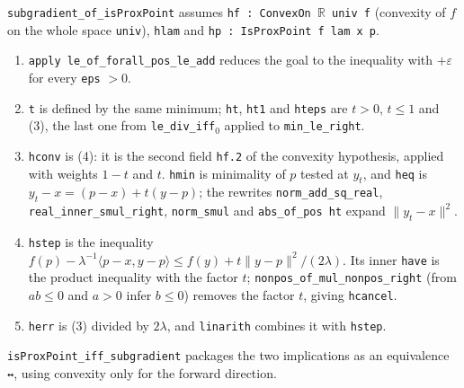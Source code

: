 \documentclass[11pt,a4paper]{article}
\begin{document}
\begin{leanbox}
\texttt{subgradient\_\allowbreak{}of\_\allowbreak{}is\allowbreak{}Prox\allowbreak{}Point} assumes \texttt{hf : Convex\allowbreak{}On \ensuremath{\mathbb R} univ f} (convexity of \(f\) on the whole space \texttt{univ}), \texttt{hlam} and \texttt{hp : Is\allowbreak{}Prox\allowbreak{}Point f lam x p}.



\begin{enumerate}


\item \texttt{apply le\_\allowbreak{}of\_\allowbreak{}forall\_\allowbreak{}pos\_\allowbreak{}le\_\allowbreak{}add} reduces the goal to the inequality with \(+\varepsilon\) for every \texttt{eps} \(>0\).

\item \texttt{t} is defined by the same minimum; \texttt{ht}, \texttt{ht1} and \texttt{hteps} are \(t>0\), \(t\le1\) and (3), the last one from \texttt{le\_\allowbreak{}div\_\allowbreak{}iff\ensuremath{{}_{0}}} applied to \texttt{min\_\allowbreak{}le\_\allowbreak{}right}.

\item \texttt{hconv} is (4): it is the second field \texttt{hf.\allowbreak{}2} of the convexity hypothesis, applied with weights \(1-t\) and \(t\). \texttt{hmin} is minimality of \(p\) tested at \(y_t\), and \texttt{heq} is \(y_t-x=(p-x)+t(y-p)\); the rewrites \texttt{norm\_\allowbreak{}add\_\allowbreak{}sq\_\allowbreak{}real}, \texttt{real\_\allowbreak{}inner\_\allowbreak{}smul\_\allowbreak{}right}, \texttt{norm\_\allowbreak{}smul} and \texttt{abs\_\allowbreak{}of\_\allowbreak{}pos ht} expand \(\|y_t-x\|^2\).

\item \texttt{hstep} is the inequality \(f(p)-\lambda^{-1}\langle p-x,y-p\rangle\le f(y)+t\|y-p\|^2/(2\lambda)\). Its inner \texttt{have} is the product inequality with the factor \(t\); \texttt{nonpos\_\allowbreak{}of\_\allowbreak{}mul\_\allowbreak{}nonpos\_\allowbreak{}right} (from \(ab\le0\) and \(a>0\) infer \(b\le0\)) removes the factor \(t\), giving \texttt{hcancel}.

\item \texttt{herr} is (3) divided by \(2\lambda\), and \texttt{linarith} combines it with \texttt{hstep}.

\end{enumerate}



\texttt{is\allowbreak{}Prox\allowbreak{}Point\_\allowbreak{}iff\_\allowbreak{}subgradient} packages the two implications as an equivalence \texttt{↔}, using convexity only for the forward direction.
\end{leanbox}
\end{document}
